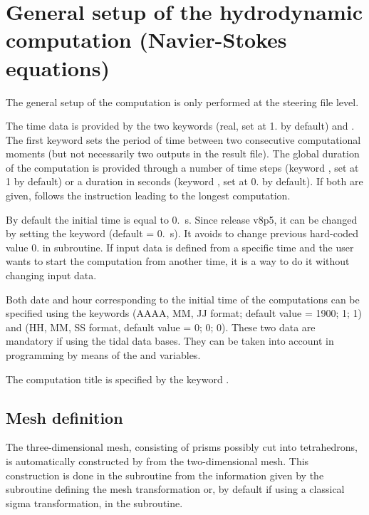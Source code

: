 \chapter{General setup of the hydrodynamic computation (Navier-Stokes equations)}

The general setup of the computation is only performed at the steering file
level.

The time data is provided by the two keywords  (real, set at
1. by default) and . The first keyword sets the
period of time between two consecutive computational moments (but not
necessarily two outputs in the result file). The global duration of the
computation is provided through a number of time steps (keyword , set at 1 by default) or a duration in seconds (keyword
, set at 0. by default). If both are given,  follows
the instruction leading to the longest computation.

By default the initial time is equal to 0.~s.
Since release v8p5, it can be changed by setting the keyword
 (default = 0.~s).
It avoids to change previous hard-coded value 0. in  subroutine.
If input data is defined from a specific time and the user wants to start the
computation from another time, it is a way to do it without changing input data.

Both date and hour corresponding to the initial time of the computations can be
specified using the keywords 
(AAAA, MM, JJ format; default value = 1900; 1; 1) and  (HH, MM, SS format, default value = 0; 0; 0).
These two data are mandatory if using the tidal data bases.
They can be taken into account in programming by means of the 
and  variables.

The computation title is specified by the keyword .


\section{Mesh definition}

The three-dimensional mesh, consisting of prisms possibly cut into
tetrahedrons, is automatically constructed by  from the
two-dimensional mesh. This construction is done in the 
subroutine from the information given by the subroutine defining the
mesh transformation  or, by default if using a
classical sigma transformation, in the  subroutine.

